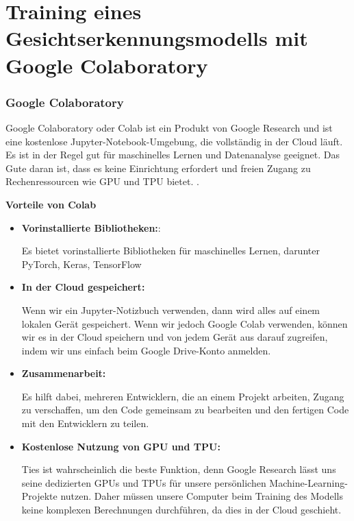 

%
%



\chapter{Training eines Gesichtserkennungsmodells mit Google Colaboratory}

\subsection{Google Colaboratory}

Google Colaboratory oder Colab ist ein Produkt von Google Research und ist eine kostenlose Jupyter-Notebook-Umgebung, die vollständig in der Cloud läuft. Es ist in der Regel gut für maschinelles Lernen und Datenanalyse geeignet. Das Gute daran ist, dass es keine Einrichtung erfordert und freien Zugang zu Rechenressourcen wie GPU und TPU bietet. \cite{GoogleColab:2021}.

\bigskip


\textbf{Vorteile von Colab} 

\begin{itemize}  
	\item \textbf{Vorinstallierte Bibliotheken:}:
	
	Es bietet vorinstallierte Bibliotheken für maschinelles Lernen, darunter PyTorch, Keras, TensorFlow
	
	\item \textbf{In der Cloud gespeichert:}
	
	Wenn wir ein Jupyter-Notizbuch verwenden, dann wird alles auf einem lokalen Gerät gespeichert. Wenn wir jedoch Google Colab verwenden, können wir es in der Cloud speichern und von jedem Gerät aus darauf zugreifen, indem wir uns einfach beim Google Drive-Konto anmelden.
	
	\item \textbf{Zusammenarbeit:}
	
	Es hilft dabei, mehreren Entwicklern, die an einem Projekt arbeiten, Zugang zu verschaffen, um den Code gemeinsam zu bearbeiten und den fertigen Code mit den Entwicklern zu teilen.
	
	\item \textbf{Kostenlose Nutzung von GPU und TPU:}
	
	Ties ist wahrscheinlich die beste Funktion, denn Google Research lässt uns seine dedizierten GPUs und TPUs für unsere persönlichen Machine-Learning-Projekte nutzen. Daher müssen unsere Computer beim Training des Modells keine komplexen Berechnungen durchführen, da dies in der Cloud geschieht.
	
\end{itemize}


